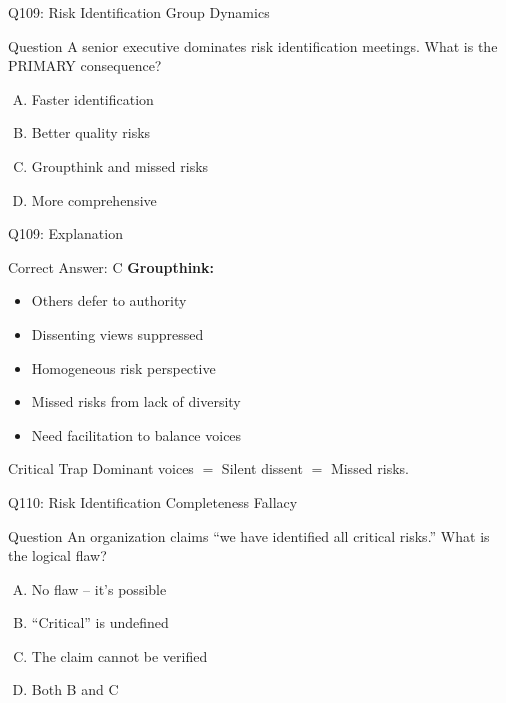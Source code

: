 \documentclass{beamer}
\begin{document}
	\begin{frame}{Q109: Risk Identification Group Dynamics}
		\begin{block}{Question}
			A senior executive dominates risk identification meetings. What is the PRIMARY consequence?
		\end{block}
		\begin{enumerate}[(A)]
			\item Faster identification
			\item Better quality risks
			\item Groupthink and missed risks
			\item More comprehensive
		\end{enumerate}
	\end{frame}
	
	\begin{frame}{Q109: Explanation}
		\begin{block}{Correct Answer: C}
			\textbf{Groupthink:}
			\begin{itemize}
				\item Others defer to authority
				\item Dissenting views suppressed
				\item Homogeneous risk perspective
				\item Missed risks from lack of diversity
				\item Need facilitation to balance voices
			\end{itemize}
		\end{block}
		\begin{alertblock}{Critical Trap}
			Dominant voices $=$ Silent dissent $=$ Missed risks.
		\end{alertblock}
	\end{frame}
	
	\begin{frame}{Q110: Risk Identification Completeness Fallacy}
		\begin{block}{Question}
			An organization claims ``we have identified all critical risks.'' What is the logical flaw?
		\end{block}
		\begin{enumerate}[(A)]
			\item No flaw -- it's possible
			\item ``Critical'' is undefined
			\item The claim cannot be verified
			\item Both B and C
		\end{enumerate}
	\end{frame}
	
\end{document}
